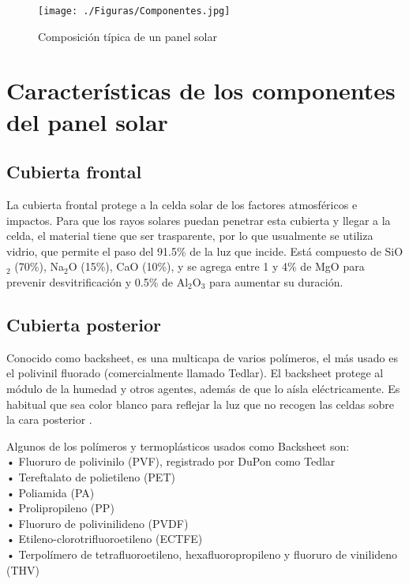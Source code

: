   \begin{figure}[htb]
  	\begin{center}
  		\texttt{[image: ./Figuras/Componentes.jpg]}
  	\end{center}
  	\vspace{-1em} %
  	\caption{Composición típica de un panel solar}
  	\label{fig:Componentes panel}
  \end{figure}
  
\section{Características de los componentes del panel solar}
\label{sec:caracteristicas de componentes}  

\subsection{Cubierta frontal}
\label{sec:cubierta frontal}   

 La cubierta frontal protege a la celda solar de los factores atmosféricos e impactos. Para que los rayos solares puedan penetrar esta cubierta y llegar a la celda, el material tiene que ser trasparente, por lo que usualmente se utiliza vidrio, que permite el paso del 91.5\% de la luz que incide. Está compuesto de SiO$_{2}$ (70\%), Na$_{2}$O (15\%), CaO (10\%), y se agrega entre 1 y 4\% de MgO para prevenir desvitrificación y 0.5\% de Al$_{2}$O$_{3}$ para aumentar su duración.  
 
 \subsection{Cubierta posterior}
 \label{sec:cubierta posterior} 
 
 Conocido como backsheet, es una multicapa de varios polímeros, el más usado es el polivinil fluorado (comercialmente llamado Tedlar). El backsheet protege al módulo de la humedad y otros agentes, además de que lo aísla eléctricamente. Es habitual que sea color blanco para reflejar la luz que no recogen las celdas sobre la cara posterior \citep{Kim2012}.
 
 Algunos de los polímeros y termoplásticos usados como Backsheet son:\\
 •	Fluoruro de polivinilo (PVF), registrado por DuPon como Tedlar\\
 •	Tereftalato de polietileno (PET)\\
 •	Poliamida (PA)\\
 •	Prolipropileno (PP)\\
 •	Fluoruro de polivinilideno (PVDF)\\
 •	Etileno-clorotrifluoroetileno (ECTFE)\\
 •	Terpolímero de tetrafluoroetileno, hexafluoropropileno y fluoruro de vinilideno (THV)\\ 
 
